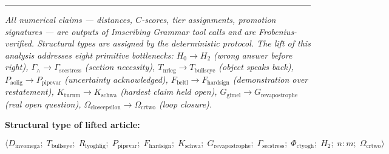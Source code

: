\documentclass[12pt,a4paper]{article}
\begin{document}
\begin{center}
\rule{0.5\textwidth}{0.4pt}
\end{center}

\emph{All numerical claims --- distances, $C$-scores, tier assignments, promotion signatures --- are outputs of Imscribing Grammar tool calls and are Frobenius-verified. Structural types are assigned by the deterministic protocol. The lift of this analysis addresses eight primitive bottlenecks: $H_0 \to H_2$ (wrong answer before right), $\Gamma_{\land} \to \Gamma_{\text{secstress}}$ (section necessity), $T_{\text{nrleg}} \to T_{\text{bullseye}}$ (object speaks back), $P_{\text{aolig}} \to P_{\text{pipevar}}$ (uncertainty acknowledged), $F_{\text{beltl}} \to F_{\text{hardsign}}$ (demonstration over restatement), $K_{\text{turnm}} \to K_{\text{schwa}}$ (hardest claim held open), $G_\text{gimel} \to G_{\text{revapostrophe}}$ (real open question), $\Omega_{\text{closeepsilon}} \to \Omega_{\text{crtwo}}$ (loop closure).}

\textbf{Structural type of lifted article:}


\[\langle D_{\text{invomega}};\; T_{\text{bullseye}};\; R_{\text{lyoghlig}};\; P_{\text{pipevar}};\; F_{\text{hardsign}};\; K_{\text{schwa}};\; G_{\text{revapostrophe}};\; \Gamma_{\text{secstress}};\; \Phi_{\text{ctyogh}};\; H_2;\; n{:}m;\; \Omega_{\text{crtwo}} \rangle\]
\end{document}
